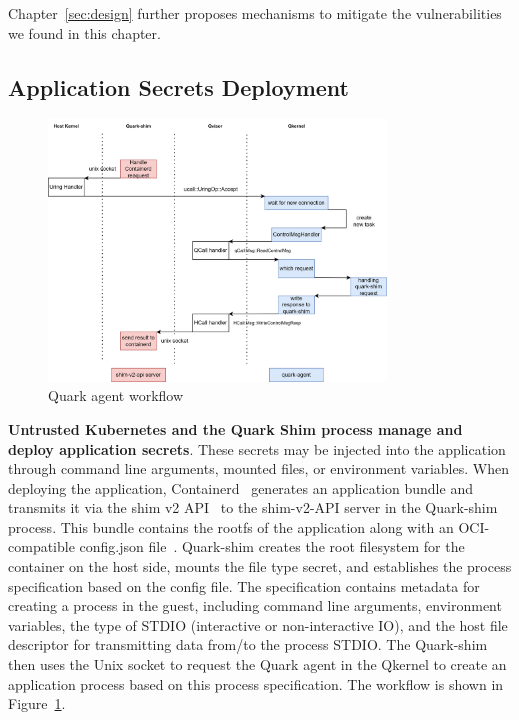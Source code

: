 Chapter~\ref{sec:design} further proposes mechanisms to mitigate the vulnerabilities we found in this chapter.


\subsection{Application Secrets Deployment}
\begin{figure}[htp]
    \centering
    \includegraphics[width=0.8\textwidth]{images/quark-agent-work-flow.png}
    \caption[Quark Agent Workflow]{Quark agent workflow}
    \label{fig:quark_agent_work_flow}
\end{figure}


\textbf{Untrusted Kubernetes and the Quark Shim process manage and deploy application secrets}. 
These secrets may be injected into the application through command line arguments, mounted files, or environment variables. When deploying the application, Containerd~\cite*{containerd} generates an application 
bundle and transmits it via the shim v2 API~\cite*{shim_v2} to the shim-v2-API server in the Quark-shim process. This bundle contains the rootfs of the application along with an OCI-compatible config.json file~\cite*{oci-runtime-spec}. Quark-shim creates the root filesystem for the container on the host side, 
mounts the file type secret, and establishes the process specification based on the config file. The specification contains metadata for creating a process in the guest, including command line arguments, environment variables, the type of STDIO (interactive or non-interactive IO), and the host file descriptor 
for transmitting data from/to the process STDIO. The Quark-shim then uses the Unix socket to request the Quark agent in the Qkernel to create an application process based on this process specification. The workflow is shown in Figure~\ref*{fig:quark_agent_work_flow}.

